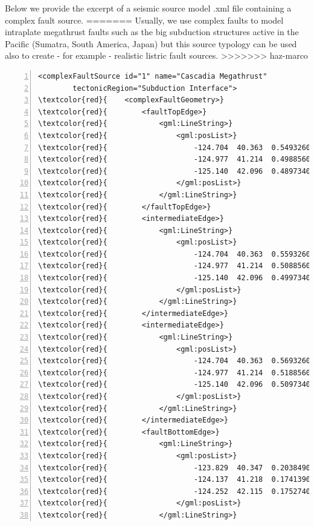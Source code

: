 \begin{itemize}
Below we provide the excerpt of a seismic source model .xml file 
containing a complex fault source.
=======
Usually, we use complex faults to model intraplate megathrust faults such 
as the big subduction structures active in the Pacific (Sumatra, South 
America, Japan) but this source typology can be used also to create - for
example - realistic listric fault sources.
%
>>>>>>> haz-marco
\begin{Verbatim}[frame=single, commandchars=\\\{\}, fontsize=\footnotesize,
    numbers=left, numbersep=2pt]
<complexFaultSource id="1" name="Cascadia Megathrust" 
		tectonicRegion="Subduction Interface">
\textcolor{red}{    <complexFaultGeometry>}
\textcolor{red}{        <faultTopEdge>}
\textcolor{red}{            <gml:LineString>}
\textcolor{red}{                <gml:posList>}
\textcolor{red}{                    -124.704  40.363  0.5493260E+01}
\textcolor{red}{                    -124.977  41.214  0.4988560E+01}
\textcolor{red}{                    -125.140  42.096  0.4897340E+01}
\textcolor{red}{                </gml:posList>}
\textcolor{red}{            </gml:LineString>}
\textcolor{red}{        </faultTopEdge>}
\textcolor{red}{        <intermediateEdge>}
\textcolor{red}{            <gml:LineString>}
\textcolor{red}{                <gml:posList>}
\textcolor{red}{                    -124.704  40.363  0.5593260E+01}
\textcolor{red}{                    -124.977  41.214  0.5088560E+01}
\textcolor{red}{                    -125.140  42.096  0.4997340E+01}
\textcolor{red}{                </gml:posList>}
\textcolor{red}{            </gml:LineString>}
\textcolor{red}{        </intermediateEdge>}
\textcolor{red}{        <intermediateEdge>}
\textcolor{red}{            <gml:LineString>}
\textcolor{red}{                <gml:posList>}
\textcolor{red}{                    -124.704  40.363  0.5693260E+01}
\textcolor{red}{                    -124.977  41.214  0.5188560E+01}
\textcolor{red}{                    -125.140  42.096  0.5097340E+01}
\textcolor{red}{                </gml:posList>}
\textcolor{red}{            </gml:LineString>}
\textcolor{red}{        </intermediateEdge>}
\textcolor{red}{        <faultBottomEdge>}
\textcolor{red}{            <gml:LineString>}
\textcolor{red}{                <gml:posList>}
\textcolor{red}{                    -123.829  40.347  0.2038490E+02}
\textcolor{red}{                    -124.137  41.218  0.1741390E+02}
\textcolor{red}{                    -124.252  42.115  0.1752740E+02}
\textcolor{red}{                </gml:posList>}
\textcolor{red}{            </gml:LineString>}

\end{Verbatim}
\end{itemize}
